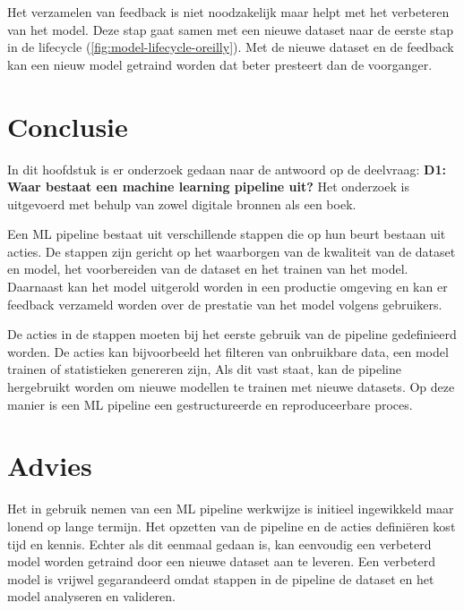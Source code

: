 Het verzamelen van feedback is niet noodzakelijk maar helpt met het verbeteren van het model. Deze stap gaat samen met een nieuwe dataset naar de eerste stap in de lifecycle (\autoref{fig:model-lifecycle-oreilly}). Met de nieuwe dataset en de feedback kan een nieuw model getraind worden dat beter presteert dan de voorganger.

\section{Conclusie}\label{sec:ch4-conclusie}
In dit hoofdstuk is er onderzoek gedaan naar de antwoord op de deelvraag: \textbf{D1: Waar bestaat een machine learning pipeline uit?} Het onderzoek is uitgevoerd met behulp van zowel digitale bronnen als een boek.

Een ML pipeline bestaat uit verschillende stappen die op hun beurt bestaan uit acties. De stappen zijn gericht op het waarborgen van de kwaliteit van de dataset en model, het voorbereiden van de dataset en het trainen van het model. Daarnaast kan het model uitgerold worden in een productie omgeving en kan er feedback verzameld worden over de prestatie van het model volgens gebruikers.

De acties in de stappen moeten bij het eerste gebruik van de pipeline gedefinieerd worden. De acties kan bijvoorbeeld het filteren van onbruikbare data, een model trainen of statistieken genereren zijn, Als dit vast staat, kan de pipeline hergebruikt worden om nieuwe modellen te trainen met nieuwe datasets. Op deze manier is een ML pipeline een gestructureerde en reproduceerbare proces.

\section{Advies}\label{sec:ch4-advies}
Het in gebruik nemen van een ML pipeline werkwijze is initieel ingewikkeld maar lonend op lange termijn. Het opzetten van de pipeline en de acties definiëren kost tijd en kennis. Echter als dit eenmaal gedaan is, kan eenvoudig een verbeterd model worden getraind door een nieuwe dataset aan te leveren. Een verbeterd model is vrijwel gegarandeerd omdat stappen in de pipeline de dataset en het model analyseren en valideren.

